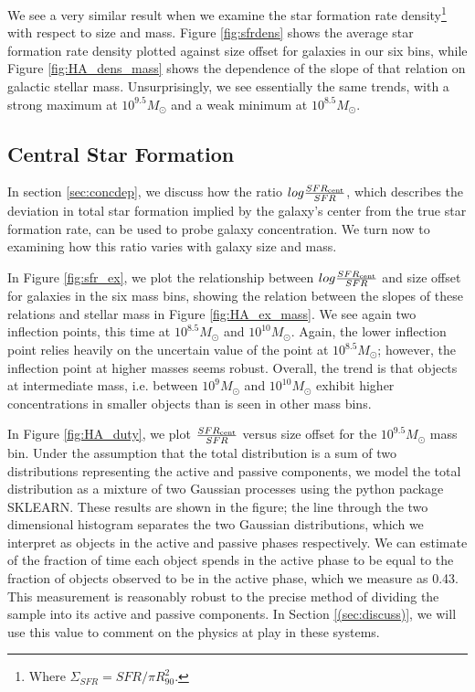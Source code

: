\documentclass[iop]{emulateapj}
\begin{document}
We see a very similar result when we examine the star formation rate density\footnote{Where $\Sigma_{SFR} = SFR/\pi R_{90}^2$.} with respect to size and mass. Figure \ref{fig:sfrdens} shows the average star formation rate density plotted against size offset for galaxies in our six bins, while Figure \ref{fig:HA_dens_mass} shows the dependence of the slope of that relation on galactic stellar mass. Unsurprisingly, we see essentially the same trends, with a strong maximum at  $10^{9.5} M_{\odot}$ and a weak minimum at $10^{8.5} M_{\odot}$.

\subsection{Central Star Formation}
\label{sec:conc}

In section \ref{sec:concdep}, we discuss how the ratio $log \frac{SFR_{\rm cent}}{SFR}$, which describes the deviation in total star formation implied by the galaxy's center from the true star formation rate, can be used to probe galaxy concentration. We turn now to examining how this ratio varies with galaxy size and mass.

In Figure \ref{fig:sfr_ex}, we plot the relationship between $log \frac{SFR_{\rm cent}}{SFR}$ and size offset for galaxies in the six mass bins, showing the relation between the slopes of these relations and stellar mass in Figure \ref{fig:HA_ex_mass}. We see again two inflection points, this time at $10^{8.5} M_{\odot}$ and $10^{10} M_{\odot}$. Again, the lower inflection point relies heavily on the uncertain value of the point at $10^{8.5} M_{\odot}$; however, the inflection point at higher masses seems robust. Overall, the trend is that objects at intermediate mass, i.e. between $10^{9} M_{\odot}$ and $10^{10} M_{\odot}$ exhibit higher concentrations in smaller objects than is seen in other mass bins. 

In Figure \ref{fig:HA_duty}, we plot $\frac{SFR_{\rm cent}}{SFR}$ versus size offset for the $10^{9.5} M_{\odot}$ mass bin. Under the assumption that the total distribution is a sum of two distributions representing the active and passive components, we model the total distribution as a mixture of two Gaussian processes using the python package SKLEARN. These results are shown in the figure; the line through the two dimensional histogram separates the two Gaussian distributions, which we interpret as objects in the active and passive phases respectively. We can estimate of the fraction of time each object spends in the active phase to be equal to the fraction of objects observed to be in the active phase, which we measure as 0.43. This measurement is reasonably robust to the precise method of dividing the sample into its active and passive components. In Section \ref{(sec:discuss)}, we will use this value to comment on the physics at play in these systems.
\end{document}
